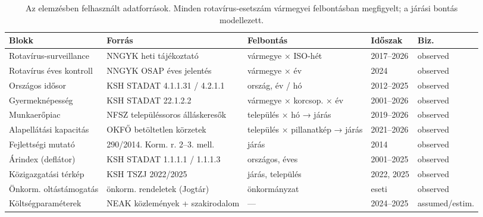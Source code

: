 \begin{table}[htbp]
\centering
\small
\begin{tabular}{p{2.5cm}p{3.7cm}p{4.0cm}p{1.8cm}p{1.6cm}}
\toprule
Blokk & Forrás & Felbontás & Időszak & Biz. \\
\midrule
Rotavírus-surveillance & NNGYK heti tájékoztató & vármegye × ISO-hét & 2017--2026 & observed \\
Rotavírus éves kontroll & NNGYK OSAP éves jelentés & vármegye × év & 2024 & observed \\
Országos idősor & KSH STADAT 4.1.1.31 / 4.2.1.1 & ország, év / hó & 2012--2025 & observed \\
Gyermeknépesség & KSH STADAT 22.1.2.2 & vármegye × korcsop. × év & 2001--2026 & observed \\
Munkaerőpiac & NFSZ településsoros álláskeresők & település × hó → járás & 2019--2026 & observed \\
Alapellátási kapacitás & OKFŐ betöltetlen körzetek & település × pillanatkép → járás & 2021--2026 & observed \\
Fejlettségi mutató & 290/2014. Korm. r. 2--3. mell. & járás & 2014 & observed \\
Árindex (deflátor) & KSH STADAT 1.1.1.1 / 1.1.1.3 & országos, éves & 2001--2025 & observed \\
Közigazgatási térkép & KSH TSZJ 2022/2025 & járás, település & 2022, 2025 & observed \\
Önkorm. oltástámogatás & önkorm. rendeletek (Jogtár) & önkormányzat & eseti & observed \\
Költségparaméterek & NEAK közlemények + szakirodalom & — & 2024--2025 & assumed/estim. \\
\bottomrule
\end{tabular}
\caption{Az elemzésben felhasznált adatforrások. Minden rotavírus-esetszám vármegyei felbontásban megfigyelt; a járási bontás modellezett.}
\label{tab:sources}
\end{table}
